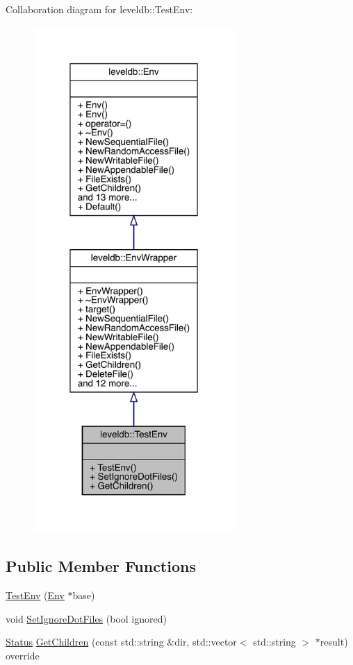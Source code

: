 Collaboration diagram for leveldb\+::Test\+Env\+:
\nopagebreak
\begin{figure}[H]
\begin{center}
\leavevmode
\includegraphics[width=217pt]{classleveldb_1_1_test_env__coll__graph}
\end{center}
\end{figure}
\subsection*{Public Member Functions}
\begin{DoxyCompactItemize}
\item 
\mbox{\hyperlink{classleveldb_1_1_test_env_ae8ebf0e06a16ac38b4004659f7f647fa}{Test\+Env}} (\mbox{\hyperlink{classleveldb_1_1_env}{Env}} $\ast$base)
\item 
void \mbox{\hyperlink{classleveldb_1_1_test_env_a53f3533febb86f9c1d424ce329a74bf9}{Set\+Ignore\+Dot\+Files}} (bool ignored)
\item 
\mbox{\hyperlink{classleveldb_1_1_status}{Status}} \mbox{\hyperlink{classleveldb_1_1_test_env_ac0ab9af039ce4ca277c3df2b437821a7}{Get\+Children}} (const std\+::string \&dir, std\+::vector$<$ std\+::string $>$ $\ast$result) override
\end{DoxyCompactItemize}
